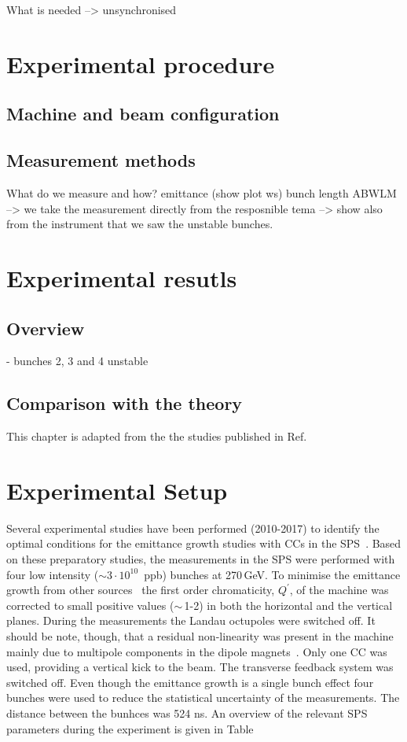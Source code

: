 \newpage



What is needed --> unsynchronised


\section{Experimental procedure}

\subsection{Machine and beam configuration}
\subsection{Measurement methods}
 What do we measure and how? emittance (show plot ws)
 bunch length ABWLM --> we take the measurement directly from the resposnible tema
 --> show also from the instrument that we saw the unstable bunches.

 \section{Experimental resutls}
 \subsection{Overview}
 - bunches 2, 3 and 4 unstable
 \subsection{Comparison with the theory}

 \newpage 
 This chapter is adapted from the the studies published in Ref.~\cite{Triantafyllou}

 \section{Experimental Setup} %

Several experimental studies have been performed (2010-2017) to identify the optimal conditions for the emittance growth studies with CCs in the SPS~\cite{Calaga:1451286, Antoniou:2649815}. Based on these preparatory studies, the measurements in the SPS were performed with four low intensity ($\sim 3 \cdot 10^{10}$\, ppb) bunches at 270\,GeV. To minimise the emittance growth from other sources~\cite{Antoniou:2649815} the first order chromaticity, $Q^\prime$, of the machine was corrected to small positive values ($\sim$\,1-2) in both the horizontal and the vertical planes. During the measurements the Landau octupoles were switched off. It should be note, though, that a residual non-linearity was present in the machine mainly due to multipole components in the dipole magnets~\cite{Carlà:2664976, Alekou:2640326}. Only one CC was used, providing a vertical kick to the beam. The transverse feedback system was switched off. Even though the emittance growth is a single bunch effect four bunches were used to reduce the statistical uncertainty of the measurements. The distance between the bunhces was 524 ns. An overview of the relevant SPS parameters during the experiment is given in Table%


